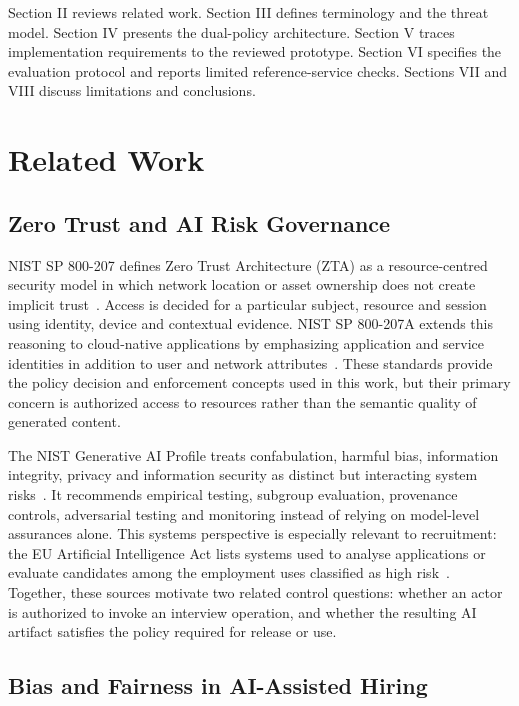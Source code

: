 \documentclass[conference]{IEEEtran}
\begin{document}
Section II reviews related work. Section III defines terminology and the threat model. Section IV presents the dual-policy architecture. Section V traces implementation requirements to the reviewed prototype. Section VI specifies the evaluation protocol and reports limited reference-service checks. Sections VII and VIII discuss limitations and conclusions.

\section{Related Work}

\subsection{Zero Trust and AI Risk Governance}

NIST SP 800-207 defines Zero Trust Architecture (ZTA) as a resource-centred security model in which network location or asset ownership does not create implicit trust~\cite{rose2020zero}. Access is decided for a particular subject, resource and session using identity, device and contextual evidence. NIST SP 800-207A extends this reasoning to cloud-native applications by emphasizing application and service identities in addition to user and network attributes~\cite{chandramouli2023zero}. These standards provide the policy decision and enforcement concepts used in this work, but their primary concern is authorized access to resources rather than the semantic quality of generated content.

The NIST Generative AI Profile treats confabulation, harmful bias, information integrity, privacy and information security as distinct but interacting system risks~\cite{nist2024genai}. It recommends empirical testing, subgroup evaluation, provenance controls, adversarial testing and monitoring instead of relying on model-level assurances alone. This systems perspective is especially relevant to recruitment: the EU Artificial Intelligence Act lists systems used to analyse applications or evaluate candidates among the employment uses classified as high risk~\cite{eu2024aiact}. Together, these sources motivate two related control questions: whether an actor is authorized to invoke an interview operation, and whether the resulting AI artifact satisfies the policy required for release or use.

\subsection{Bias and Fairness in AI-Assisted Hiring}
\end{document}
